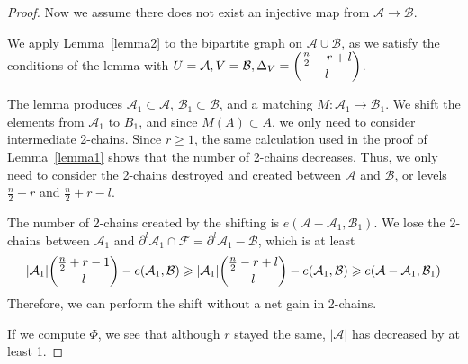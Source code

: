 \documentclass[12pt]{article}
\theoremstyle{plain}
\theoremstyle{definition}
\theoremstyle{remark}
\newcommand{\F}{\mathcal{F}}
\newcommand{\A}{\mathcal{A}}
\newcommand{\B}{\mathcal{B}}
\begin{document}
\begin{proof}

Now we assume there does not exist an injective map from $\A \rightarrow \B$.

We apply Lemma~\ref{lemma2} to the bipartite graph on $\A \cup \B$, as we satisfy the conditions of the lemma with $U = \A, V = \B, \Delta_V = \dbinom{\frac{n}{2} - r + l}{l}$.

The lemma produces $\A_1 \subset \A$, $\B_1 \subset \B$, and a matching $M:\A_1 \rightarrow \B_1$. We shift the elements from $\A_1$ to $B_1$, and since $M(A) \subset A$, we only need to consider intermediate 2-chains. Since $r \geq 1$, the same calculation used in the proof of Lemma~\ref{lemma1} shows that the number of 2-chains decreases. Thus, we only need to consider the 2-chains destroyed and created between $\A$ and $\B$, or levels $\frac{n}{2} + r$ and $\frac{n}{2} + r - l$.


The number of 2-chains created by the shifting is $e(\A - \A_1, \B_1)$. We lose the 2-chains between $\A_1$ and $\partial^l\A_1 \cap \F = \partial^l\A_1 - \B$, which is at least
\[ |\A_1|\dbinom{\frac{n}{2}+r-1}{l} - e(\A_1, \B) \geq |\A_1|\dbinom{\frac{n}{2} - r + l}{l} - e(\A_1, \B) \geq e(\A - \A_1, \B_1) \] 
Therefore, we can perform the shift without a net gain in 2-chains.

If we compute $\Phi$, we see that although $r$ stayed the same, $|\A|$ has decreased by at least 1.
\end{proof}
\end{document}
